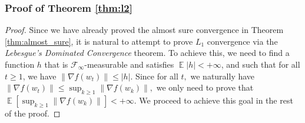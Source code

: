 \documentclass{article} %
\DeclareMathOperator{\Expect}{\mathbb{E}}
\begin{document}
\subsubsection{Proof of Theorem \ref{thm:l2}}\label{qwerewqq}
\begin{proof}
Since we have already proved the almost sure convergence in Theorem \ref{thm:almost_sure}, it is natural to attempt to prove $L_1$ convergence via the \emph{Lebesgue's Dominated Convergence} theorem. To achieve this, we need to find a function $h$ that is $\mathscr{F}_{\infty}$-measurable and satisfies $\Expect|h| < +\infty$, and such that for all $t \geq 1$, we have $\|\nabla f(w_{t})\| \leq |h|.$ Since for all $t,$ we naturally have $\|\nabla f(w_{t})\| \leq \sup_{k \geq 1} \|\nabla f(w_{k})\|,$ we only need to prove that $\Expect[\sup_{k \geq 1} \|\nabla f(w_{k})\|] < +\infty.$ We proceed to achieve this goal in the rest of the proof.


\end{proof}
\end{document}
